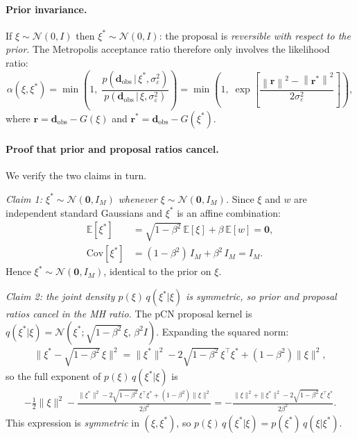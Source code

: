 \documentclass[11pt, a4paper]{article}
\newcommand{\N}{\mathcal{N}}
\newcommand{\E}{\mathbb{E}}
\newcommand{\norm}[1]{\left\|#1\right\|}
\theoremstyle{definition}
\begin{document}
\paragraph{Prior invariance.}
If $\xi\sim\N(0,I)$ then $\xi^*\sim\N(0,I)$: the proposal is
\emph{reversible with respect to the prior}.  The Metropolis
acceptance ratio therefore only involves the likelihood ratio:
\begin{equation}
  \alpha(\xi,\xi^*)
  = \min\!\left(1,\;
    \frac{p(\mathbf{d}_{\mathrm{obs}}\,|\,\xi^*,\sigma_\varepsilon^2)}
         {p(\mathbf{d}_{\mathrm{obs}}\,|\,\xi,\sigma_\varepsilon^2)}
  \right)
  = \min\!\left(1,\;
    \exp\!\left[\frac{\norm{\mathbf{r}}^2-\norm{\mathbf{r}^*}^2}{2\sigma_\varepsilon^2}\right]\right),
  \label{eq:pcn_accept}
\end{equation}
where $\mathbf{r}=\mathbf{d}_{\mathrm{obs}}-G(\xi)$ and
$\mathbf{r}^*=\mathbf{d}_{\mathrm{obs}}-G(\xi^*)$.

\paragraph{Proof that prior and proposal ratios cancel.}
We verify the two claims in turn.

\textit{Claim 1: $\xi^*\sim\N(\mathbf{0},I_M)$ whenever $\xi\sim\N(\mathbf{0},I_M)$.}
Since $\xi$ and $w$ are independent standard Gaussians and $\xi^*$ is an affine
combination:
\begin{align*}
  \E[\xi^*] &= \sqrt{1-\beta^2}\,\E[\xi] + \beta\,\E[w] = \mathbf{0},\\
  \mathrm{Cov}[\xi^*]
    &= (1-\beta^2)\,I_M + \beta^2\,I_M = I_M.
\end{align*}
Hence $\xi^*\sim\N(\mathbf{0},I_M)$, identical to the prior on $\xi$.

\textit{Claim 2: the joint density $p(\xi)\,q(\xi^*|\xi)$ is symmetric, so
prior and proposal ratios cancel in the MH ratio.}
The pCN proposal kernel is $q(\xi^*|\xi)=\N(\xi^*;\sqrt{1-\beta^2}\,\xi,\,\beta^2I)$.
Expanding the squared norm:
\begin{align*}
  \|\xi^*-\sqrt{1-\beta^2}\,\xi\|^2
  = \|\xi^*\|^2 - 2\sqrt{1-\beta^2}\,\xi^\top\!\xi^* + (1-\beta^2)\|\xi\|^2,
\end{align*}
so the full exponent of $p(\xi)\,q(\xi^*|\xi)$ is
\begin{align*}
  -\tfrac{1}{2}\|\xi\|^2
  - \frac{\|\xi^*\|^2 - 2\sqrt{1-\beta^2}\,\xi^\top\!\xi^* + (1-\beta^2)\|\xi\|^2}%
         {2\beta^2}
  = -\frac{\|\xi\|^2 + \|\xi^*\|^2 - 2\sqrt{1-\beta^2}\,\xi^\top\!\xi^*}{2\beta^2}.
\end{align*}
This expression is \emph{symmetric} in $(\xi,\xi^*)$, so
$p(\xi)\,q(\xi^*|\xi)=p(\xi^*)\,q(\xi|\xi^*)$.
\end{document}
